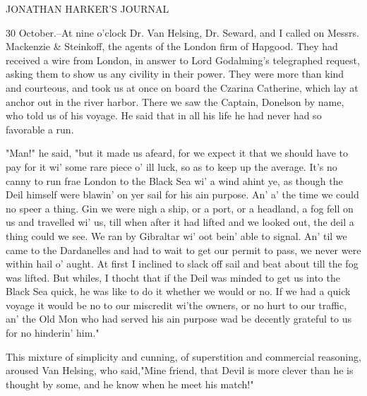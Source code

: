 JONATHAN HARKER'S JOURNAL 

30 October.--At nine o'clock Dr. Van Helsing, Dr. Seward, and I called on Messrs. Mackenzie \& Steinkoff, the agents of the London firm of Hapgood. They had received a wire from London, in answer to Lord Godalming's telegraphed request, asking them to show us any civility in their power. They were more than kind and courteous, and took us at once on board the Czarina Catherine, which lay at anchor out in the river harbor. There we saw the Captain, Donelson by name, who told us of his voyage. He said that in all his life he had never had so favorable a run. 

"Man!" he said, "but it made us afeard, for we expect it that we should have to pay for it wi' some rare piece o' ill luck, so as to keep up the average. It's no canny to run frae London to the Black Sea wi' a wind ahint ye, as though the Deil himself were blawin' on yer sail for his ain purpose. An' a' the time we could no speer a thing. Gin we were nigh a ship, or a port, or a headland, a fog fell on us and travelled wi' us, till when after it had lifted and we looked out, the deil a thing could we see. We ran by Gibraltar wi' oot bein' able to signal. An' til we came to the Dardanelles and had to wait to get our permit to pass, we never were within hail o' aught. At first I inclined to slack off sail and beat about till the fog was lifted. But whiles, I thocht that if the Deil was minded to get us into the Black Sea quick, he was like to do it whether we would or no. If we had a quick voyage it would be no to our miscredit wi'the owners, or no hurt to our traffic, an' the Old Mon who had served his ain purpose wad be decently grateful to us for no hinderin' him." 

This mixture of simplicity and cunning, of superstition and commercial reasoning, aroused Van Helsing, who said,"Mine friend, that Devil is more clever than he is thought by some, and he know when he meet his match!" 

